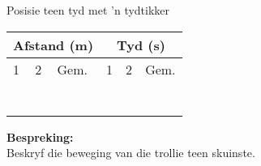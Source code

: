 \begin{f_experiment}{Posisie teen tyd met 'n tydtikker}
\begin{table}[H]
\begin{center}
      \label{m38795*id7141349}
      \begin{tabular}{|l|l|l|l|l|l|}\hline
    \multicolumn{3}{|c|}{Afstand (m)}
     &
    \multicolumn{3}{c|}{Tyd (s)}
     \\ \hline
        1 &
        2 &
        Gem. &
        1 &
        2 &
        Gem. \\ \hline
         &
         &
         &
         &
         &
      \\ \hline
         &
         &
         &
         &
         &
       \\ \hline
         &
         &
         &
         &
         &
       \\ \hline
         &
         &
         &
         &
         &
        \\ \hline
         &
         &
         &
         &
         &
        \\ \hline
         &
         &
         &
         &
         &
       \\ \hline
         &
         &
         &
         &
         &
      \\ \hline
    \end{tabular}
      \end{center}
\end{table}
    \par
\textbf{Bespreking:}\\
Beskryf die beweging van die trollie teen skuinste.
\end{f_experiment}

